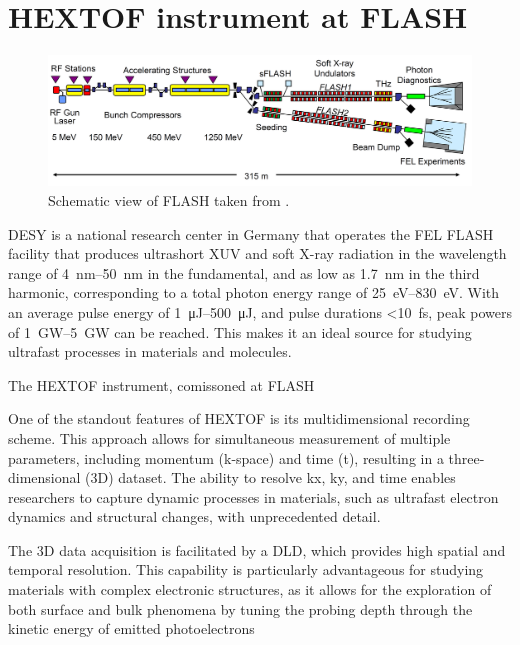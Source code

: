 \section{HEXTOF instrument at FLASH}

\begin{figure}
    \includegraphics[width=1\linewidth]{images/flash_fel.png}
    \caption{Schematic view of \gls{FLASH} taken from \cite{faatzSimultaneousOperationTwo2016}.}
    \label{fig:flash-schematic}
\end{figure}

\gls{DESY} is a national research center in Germany that operates the \gls{FEL} \gls{FLASH} facility \cite{ackermannOperationFreeelectronLaser2007,tiedtkeSoftXrayFreeelectron2009} that produces ultrashort \gls{XUV} and soft X-ray radiation in the wavelength range of \qtyrange{4}{50}{\nm} in the fundamental, and as low as \qty{1.7}{\nm} in the third harmonic, corresponding to a total photon energy range of \qtyrange{25}{830}{\eV}. With an average pulse energy of \qtyrange{1}{500}{\micro\joule}, and pulse durations \qty{<10}{\fs}, peak powers of \qtyrange{1}{5}{\giga\watt} can be reached. This makes it an ideal source for studying ultrafast processes in materials and molecules.   

The \gls{HEXTOF} instrument, comissoned at \gls{FLASH}

One of the standout features of HEXTOF is its multidimensional recording scheme. This approach allows for simultaneous measurement of multiple parameters, including momentum (k-space) and time (t), resulting in a three-dimensional (3D) dataset. The ability to resolve kx, ky, and time enables researchers to capture dynamic processes in materials, such as ultrafast electron dynamics and structural changes, with unprecedented detail.

The 3D data acquisition is facilitated by a \gls{DLD}, which provides high spatial and temporal resolution. This capability is particularly advantageous for studying materials with complex electronic structures, as it allows for the exploration of both surface and bulk phenomena by tuning the probing depth through the kinetic energy of emitted photoelectrons 

